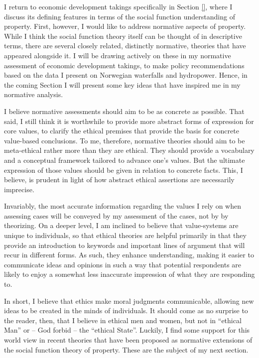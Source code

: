 I return to economic development takings specifically in Section \ref{}, where I discuss its defining features in terms of the social function understanding of property. First, however, I would like to address normative aspects of property. While I think the social function theory itself can be thought of in  descriptive terms, there are several closely related, distinctly normative, theories that have appeared alongside it. I will be drawing actively on these in my normative assessment of economic development takings, to make policy recommendations based on the data I present on Norwegian waterfalls and hydropower. Hence, in the coming Section I will present some key ideas that have inspired me in my normative analysis. 

I believe normative assessments should aim to be as concrete as possible. That said, I still think it is worthwhile to provide more abstract forms of expression for core values, to clarify the ethical premises that provide the basis for concrete value-based conclusions. To me, therefore, normative theories should aim to be meta-ethical rather more than they are ethical. They should provide a vocabulary and a conceptual framework tailored to advance one's values. But the ultimate expression of those values should be given in relation to concrete facts. This, I believe, is prudent in light of how abstract ethical assertions are necessarily imprecise. 

Invariably, the most accurate information regarding the values I rely on when assessing cases will be conveyed by my assessment of the cases, not by by theorizing. On a deeper level, I am inclined to believe that value-systems are unique to individuals, so that ethical theories are helpful primarily in that they provide an introduction to keywords and important lines of argument that will recur in different forms. As such, they enhance understanding, making it easier to communicate ideas and opinions in such a way that potential respondents are likely to enjoy a somewhat less inaccurate impression of what they are responding to. 

In short, I believe that ethics make moral judgments communicable, allowing new ideas to be created in the minds of individuals. It should come as no surprise to the reader, then, that I believe in ethical men and women, but not in ``ethical Man'' or -- God forbid --  the ``ethical State''. Luckily, I find some support for this world view in recent theories that have been proposed as normative extensions of the social function theory of property. These are the subject of my next section.

